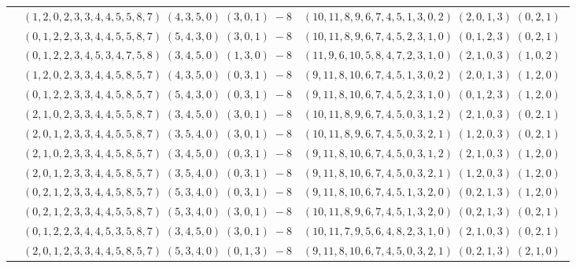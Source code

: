 \documentclass[11pt]{article}
\begin{document}
\begin{longtable}[l]{|c|c|c|}
 \cline{2-3} 
 & $(1 ,2 ,0 ,2 ,3 ,3 ,4 ,4 ,5 ,5 ,8 ,7) \;(4 ,3 ,5 ,0) \;(3 ,0 ,1) \;-8$ & $(10 ,11 ,8 ,9 ,6 ,7 ,4 ,5 ,1 ,3 ,0 ,2) \;(2 ,0 ,1 ,3) \;(0 ,2 ,1) \;$\\ 
 \cline{2-3} 
 & $(0 ,1 ,2 ,2 ,3 ,3 ,4 ,4 ,5 ,5 ,8 ,7) \;(5 ,4 ,3 ,0) \;(3 ,0 ,1) \;-8$ & $(10 ,11 ,8 ,9 ,6 ,7 ,4 ,5 ,2 ,3 ,1 ,0) \;(0 ,1 ,2 ,3) \;(0 ,2 ,1) \;$\\ 
 \cline{2-3} 
 & $(0 ,1 ,2 ,2 ,3 ,4 ,5 ,3 ,4 ,7 ,5 ,8) \;(3 ,4 ,5 ,0) \;(1 ,3 ,0) \;-8$ & $(11 ,9 ,6 ,10 ,5 ,8 ,4 ,7 ,2 ,3 ,1 ,0) \;(2 ,1 ,0 ,3) \;(1 ,0 ,2) \;$\\ 
 \cline{2-3} 
 & $(1 ,2 ,0 ,2 ,3 ,3 ,4 ,4 ,5 ,8 ,5 ,7) \;(4 ,3 ,5 ,0) \;(0 ,3 ,1) \;-8$ & $(9 ,11 ,8 ,10 ,6 ,7 ,4 ,5 ,1 ,3 ,0 ,2) \;(2 ,0 ,1 ,3) \;(1 ,2 ,0) \;$\\ 
 \cline{2-3} 
 & $(0 ,1 ,2 ,2 ,3 ,3 ,4 ,4 ,5 ,8 ,5 ,7) \;(5 ,4 ,3 ,0) \;(0 ,3 ,1) \;-8$ & $(9 ,11 ,8 ,10 ,6 ,7 ,4 ,5 ,2 ,3 ,1 ,0) \;(0 ,1 ,2 ,3) \;(1 ,2 ,0) \;$\\ 
 \cline{2-3} 
 & $(2 ,1 ,0 ,2 ,3 ,3 ,4 ,4 ,5 ,5 ,8 ,7) \;(3 ,4 ,5 ,0) \;(3 ,0 ,1) \;-8$ & $(10 ,11 ,8 ,9 ,6 ,7 ,4 ,5 ,0 ,3 ,1 ,2) \;(2 ,1 ,0 ,3) \;(0 ,2 ,1) \;$\\ 
 \cline{2-3} 
 & $(2 ,0 ,1 ,2 ,3 ,3 ,4 ,4 ,5 ,5 ,8 ,7) \;(3 ,5 ,4 ,0) \;(3 ,0 ,1) \;-8$ & $(10 ,11 ,8 ,9 ,6 ,7 ,4 ,5 ,0 ,3 ,2 ,1) \;(1 ,2 ,0 ,3) \;(0 ,2 ,1) \;$\\ 
 \cline{2-3} 
 & $(2 ,1 ,0 ,2 ,3 ,3 ,4 ,4 ,5 ,8 ,5 ,7) \;(3 ,4 ,5 ,0) \;(0 ,3 ,1) \;-8$ & $(9 ,11 ,8 ,10 ,6 ,7 ,4 ,5 ,0 ,3 ,1 ,2) \;(2 ,1 ,0 ,3) \;(1 ,2 ,0) \;$\\ 
 \cline{2-3} 
 & $(2 ,0 ,1 ,2 ,3 ,3 ,4 ,4 ,5 ,8 ,5 ,7) \;(3 ,5 ,4 ,0) \;(0 ,3 ,1) \;-8$ & $(9 ,11 ,8 ,10 ,6 ,7 ,4 ,5 ,0 ,3 ,2 ,1) \;(1 ,2 ,0 ,3) \;(1 ,2 ,0) \;$\\ 
 \cline{2-3} 
 & $(0 ,2 ,1 ,2 ,3 ,3 ,4 ,4 ,5 ,8 ,5 ,7) \;(5 ,3 ,4 ,0) \;(0 ,3 ,1) \;-8$ & $(9 ,11 ,8 ,10 ,6 ,7 ,4 ,5 ,1 ,3 ,2 ,0) \;(0 ,2 ,1 ,3) \;(1 ,2 ,0) \;$\\ 
 \cline{2-3} 
 & $(0 ,2 ,1 ,2 ,3 ,3 ,4 ,4 ,5 ,5 ,8 ,7) \;(5 ,3 ,4 ,0) \;(3 ,0 ,1) \;-8$ & $(10 ,11 ,8 ,9 ,6 ,7 ,4 ,5 ,1 ,3 ,2 ,0) \;(0 ,2 ,1 ,3) \;(0 ,2 ,1) \;$\\ 
 \cline{2-3} 
 & $(0 ,1 ,2 ,2 ,3 ,4 ,4 ,5 ,3 ,5 ,8 ,7) \;(3 ,4 ,5 ,0) \;(3 ,0 ,1) \;-8$ & $(10 ,11 ,7 ,9 ,5 ,6 ,4 ,8 ,2 ,3 ,1 ,0) \;(2 ,1 ,0 ,3) \;(0 ,2 ,1) \;$\\ 
 \cline{2-3} 
 & $(2 ,0 ,1 ,2 ,3 ,3 ,4 ,4 ,5 ,8 ,5 ,7) \;(5 ,3 ,4 ,0) \;(0 ,1 ,3) \;-8$ & $(9 ,11 ,8 ,10 ,6 ,7 ,4 ,5 ,0 ,3 ,2 ,1) \;(0 ,2 ,1 ,3) \;(2 ,1 ,0) \;$\\ 

\end{longtable}
\end{document}
